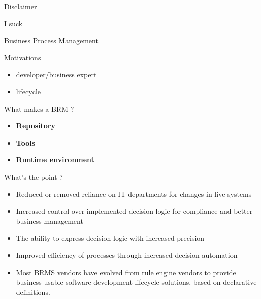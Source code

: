 
\begin{frame}
  \begin{block}{Disclaimer}
    \begin{center}
      \Large{I suck}
    \end{center}
  \end{block}
\end{frame}


\begin{frame}{Business Process Management}
  \begin{block}{Motivations}
    \begin{itemize}
      \item developer/business expert
      \item lifecycle
    \end{itemize}
  \end{block}
\end{frame}

\begin{frame}
  \begin{block}{What makes a BRM ?}
    \begin{itemize}
      \item \textbf{Repository} %
      \item \textbf{Tools} %
      \item \textbf{Runtime environment} %
     \end{itemize}
  \end{block}
\end{frame}


\begin{frame}
  \begin{block}{What's the point ?}
    \begin{itemize}
      \item Reduced or removed reliance on IT departments for changes in live systems
      \item Increased control over implemented decision logic for compliance and better business management
      \item The ability to express decision logic with increased precision %
      \item Improved efficiency of processes through increased decision automation
      \item Most BRMS vendors have evolved from rule engine vendors to provide business-usable software development lifecycle solutions, based on declarative definitions.
    \end{itemize}
  \end{block}
\end{frame}

